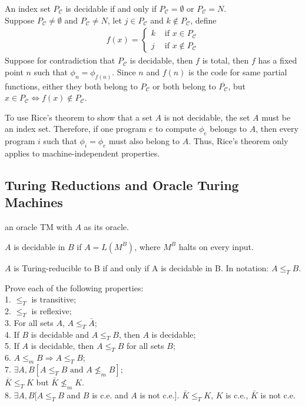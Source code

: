  An index set $P_{\mathscr{C}}$ is decidable if and only if
$P_{\mathscr{C}} = \emptyset$ or $P_{\mathscr{C}}= N$.\\
Suppose $P_{\mathscr{C}} \neq \emptyset$ and $P_{\mathscr{C}} \neq N$, let 
$j \in P_{\mathscr{C}}$ and $k \notin P_{\mathscr{C}}$, define
\begin{align*}
  f(x) = 
  \begin{cases}
    k & \text{ if } x \in P_{\mathscr{C}} \\
    j & \text{ if } x \notin P_{\mathscr{C}}
  \end{cases}
\end{align*}
Suppose for contradiction that $P_{\mathscr{C}}$ is decidable, then $f$ is
total, then $f$ has a fixed point $n$ such that $\phi_n = \phi_{f(n)}$. Since $n$
and $f(n)$ is the code for same partial functions, either they both belong to
$P_{\mathscr{C}}$ or both belong to $\overline{P_{\mathscr{C}}}$, but 
$x \in P_{\mathscr{C}} \Leftrightarrow f(x) \notin P_{\mathscr{C}}$.

To use Rice's theorem to show that a set $A$ is not decidable, the set
$A$ must be an index set. Therefore, if one program $e$ to compute $\phi_e$
belongs to $A$, then every
program $i$ such that $\phi_i = \phi_e$ must also belong to $A$. Thus,
Rice's theorem only applies to machine-independent properties.

\subsection{Turing Reductions and Oracle Turing Machines}

 an oracle TM with $A$ as its oracle.

 $A$ is decidable in $B$ if $A = L(M^B)$, where $M^B$ halts on
every input.

 $A$ is Turing-reducible to B if and only if A is decidable in
B. In notation: $A \le_T B$.

 Prove each of the following properties:\\
1. $\le_T$ is transitive;\\
2. $\le_T$ is reflexive;\\
3. For all sets $A$, $A \le_T \bar{A}$;\\
4. If $B$ is decidable and $A \le_T B$, then $A$ is decidable; \\
5. If $A$ is decidable, then $A \le_T B$ for all sets $B$;\\
6. $A \le_m B \Rightarrow A \le_T B$;\\
7. $\exists A, B[A \le_T B \text{ and } A \nleq_m B]$;\\
$\bar{K} \le_T K$ but $\bar{K} \nleq_m K$.\\
8. $\exists A, B[A \le_T B$ and $B$ is c.e. and $A$ is not c.e.].
$\bar{K} \le_T K$, $K$ is c.e., $\bar{K}$ is not c.e.


